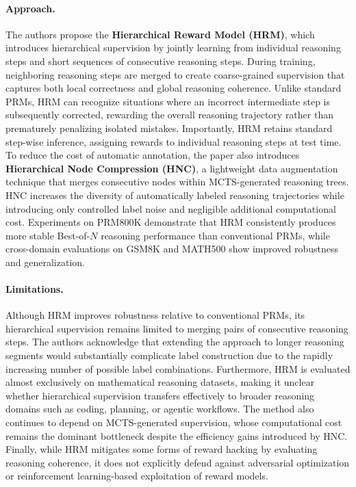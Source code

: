 \documentclass[11pt]{article}
\begin{document}
\paragraph{Approach.}
The authors propose the \textbf{Hierarchical Reward Model (HRM)}, which introduces hierarchical supervision by jointly learning from individual reasoning steps and short sequences of consecutive reasoning steps. During training, neighboring reasoning steps are merged to create coarse-grained supervision that captures both local correctness and global reasoning coherence. Unlike standard PRMs, HRM can recognize situations where an incorrect intermediate step is subsequently corrected, rewarding the overall reasoning trajectory rather than prematurely penalizing isolated mistakes. Importantly, HRM retains standard step-wise inference, assigning rewards to individual reasoning steps at test time. To reduce the cost of automatic annotation, the paper also introduces \textbf{Hierarchical Node Compression (HNC)}, a lightweight data augmentation technique that merges consecutive nodes within MCTS-generated reasoning trees. HNC increases the diversity of automatically labeled reasoning trajectories while introducing only controlled label noise and negligible additional computational cost. Experiments on PRM800K demonstrate that HRM consistently produces more stable Best-of-$N$ reasoning performance than conventional PRMs, while cross-domain evaluations on GSM8K and MATH500 show improved robustness and generalization.  

\paragraph{Limitations.}
Although HRM improves robustness relative to conventional PRMs, its hierarchical supervision remains limited to merging pairs of consecutive reasoning steps. The authors acknowledge that extending the approach to longer reasoning segments would substantially complicate label construction due to the rapidly increasing number of possible label combinations. Furthermore, HRM is evaluated almost exclusively on mathematical reasoning datasets, making it unclear whether hierarchical supervision transfers effectively to broader reasoning domains such as coding, planning, or agentic workflows. The method also continues to depend on MCTS-generated supervision, whose computational cost remains the dominant bottleneck despite the efficiency gains introduced by HNC. Finally, while HRM mitigates some forms of reward hacking by evaluating reasoning coherence, it does not explicitly defend against adversarial optimization or reinforcement learning-based exploitation of reward models.  
\end{document}
